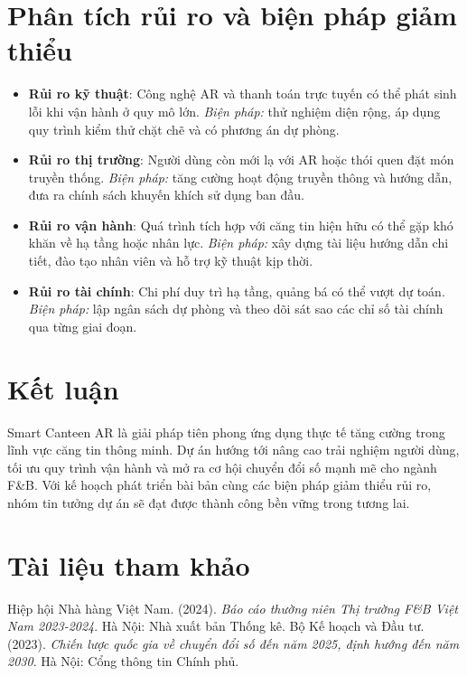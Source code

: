 \documentclass[12pt,a4paper]{article}
\begin{document}
\begin{itemize}[label=\textbullet]
\section{Phân tích rủi ro và biện pháp giảm thiểu}
\begin{riskbox}[title=Rủi ro và Biện pháp]
\begin{itemize}
    \item \textbf{Rủi ro kỹ thuật}: Công nghệ AR và thanh toán trực tuyến có thể
    phát sinh lỗi khi vận hành ở quy mô lớn. \textit{Biện pháp:} thử nghiệm diện
    rộng, áp dụng quy trình kiểm thử chặt chẽ và có phương án dự phòng.
    \item \textbf{Rủi ro thị trường}: Người dùng còn mới lạ với AR hoặc thói quen
    đặt món truyền thống. \textit{Biện pháp:} tăng cường hoạt động truyền thông
    và hướng dẫn, đưa ra chính sách khuyến khích sử dụng ban đầu.
    \item \textbf{Rủi ro vận hành}: Quá trình tích hợp với căng tin hiện hữu có thể
    gặp khó khăn về hạ tầng hoặc nhân lực. \textit{Biện pháp:} xây dựng tài liệu
    hướng dẫn chi tiết, đào tạo nhân viên và hỗ trợ kỹ thuật kịp thời.
    \item \textbf{Rủi ro tài chính}: Chi phí duy trì hạ tầng, quảng bá có thể vượt
    dự toán. \textit{Biện pháp:} lập ngân sách dự phòng và theo dõi sát sao các
    chỉ số tài chính qua từng giai đoạn.
\end{itemize}
\end{riskbox}

\section{Kết luận}
Smart Canteen AR là giải pháp tiên phong ứng dụng thực tế tăng cường trong lĩnh
vực căng tin thông minh. Dự án hướng tới nâng cao trải nghiệm người dùng, tối ưu
quy trình vận hành và mở ra cơ hội chuyển đổi số mạnh mẽ cho ngành F\&B. Với kế
hoạch phát triển bài bản cùng các biện pháp giảm thiểu rủi ro, nhóm tin tưởng dự
án sẽ đạt được thành công bền vững trong tương lai.

\clearpage %
\section{Tài liệu tham khảo}
\begin{thebibliography}{99} %
    Hiệp hội Nhà hàng Việt Nam. (2024). \textit{Báo cáo thường niên Thị trường F\&B Việt Nam 2023-2024}. Hà Nội: Nhà xuất bản Thống kê.
    Bộ Kế hoạch và Đầu tư. (2023). \textit{Chiến lược quốc gia về chuyển đổi số đến năm 2025, định hướng đến năm 2030}. Hà Nội: Cổng thông tin Chính phủ.


\end{thebibliography}
\end{itemize}
\end{document}
